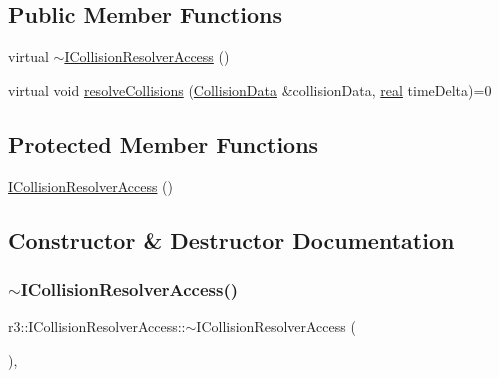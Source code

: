 \subsection*{Public Member Functions}
\begin{DoxyCompactItemize}
\item 
virtual \mbox{\hyperlink{classr3_1_1_i_collision_resolver_access_a56e8e69db0a57cb22e3c8defa8502b30}{$\sim$\+I\+Collision\+Resolver\+Access}} ()
\item 
virtual void \mbox{\hyperlink{classr3_1_1_i_collision_resolver_access_a266dfbc4c421a7c3429ef474d63fd941}{resolve\+Collisions}} (\mbox{\hyperlink{classr3_1_1_collision_data}{Collision\+Data}} \&collision\+Data, \mbox{\hyperlink{namespacer3_ab2016b3e3f743fb735afce242f0dc1eb}{real}} time\+Delta)=0
\end{DoxyCompactItemize}
\subsection*{Protected Member Functions}
\begin{DoxyCompactItemize}
\item 
\mbox{\hyperlink{classr3_1_1_i_collision_resolver_access_ade62636ccefb20b027eef0ff272d6d48}{I\+Collision\+Resolver\+Access}} ()
\end{DoxyCompactItemize}


\subsection{Constructor \& Destructor Documentation}
\mbox{\label{classr3_1_1_i_collision_resolver_access_a56e8e69db0a57cb22e3c8defa8502b30}} 
\subsubsection{\texorpdfstring{$\sim$\+I\+Collision\+Resolver\+Access()}{~ICollisionResolverAccess()}}
{\footnotesize\ttfamily r3\+::\+I\+Collision\+Resolver\+Access\+::$\sim$\+I\+Collision\+Resolver\+Access (\begin{DoxyParamCaption}{ }\end{DoxyParamCaption})\hspace{0.3cm}{\ttfamily [virtual]}, {\ttfamily [default]}}

